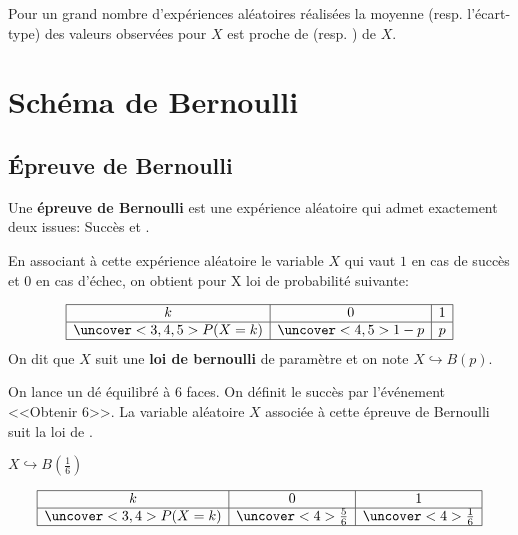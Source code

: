 \documentclass{beamer}
\begin{document}
     \begin{frame}
   \begin{theorem}
    
    Pour un grand nombre d'expériences aléatoires réalisées la moyenne (resp. l'écart-type)
    des valeurs observées pour $X$ est proche de  
    (resp. ) de $X$.
    
   \end{theorem}
   \end{frame}
   
 
   
    \section{Schéma de Bernoulli}
  \subsection{\'Epreuve de Bernoulli}
  \begin{frame}
  \begin{definition}
    Une \textbf{épreuve de Bernoulli} est une expérience aléatoire qui admet exactement deux issues:
    Succès et .
    
    En associant à cette expérience aléatoire le variable $X$ qui vaut $1$ en cas de succès et 
    $0$ en cas d'échec, on obtient pour X loi de probabilité suivante:
     
     \renewcommand{\arraystretch}{1.5}
 $$
\begin{array}{|c|c|c|}

\hline
    k&0&1\\
    \hline
    \uncover<3,4,5>{P(X=k)}&\uncover<4,5>{1-p}&p\\
    \hline
    \end{array} 
$$   
     On dit que $X$ suit une \textbf{loi de bernoulli} de paramètre  et 
     on note $X \hookrightarrow B(p)$.
  \end{definition}
  \end{frame}
  
  \begin{frame}
   \begin{example}
    On lance un dé équilibré à 6 faces. On définit le succès par l'événement <<Obtenir 6>>.
    La variable aléatoire $X$ associée à cette épreuve de Bernoulli suit la loi de 
    .
    
    $X \hookrightarrow B(\frac{1}{6})$
    
    \renewcommand{\arraystretch}{1.5}
     $$
\begin{array}{|c|c|c|}

\hline
    k&0&1\\
    \hline
    \uncover<3,4>{P(X=k)}&\uncover<4>{\frac{5}{6}}&\uncover<4>{\frac{1}{6}}\\
    \hline
    \end{array} 
$$
  
 \end{example}
 \end{frame}
 
\end{document}
